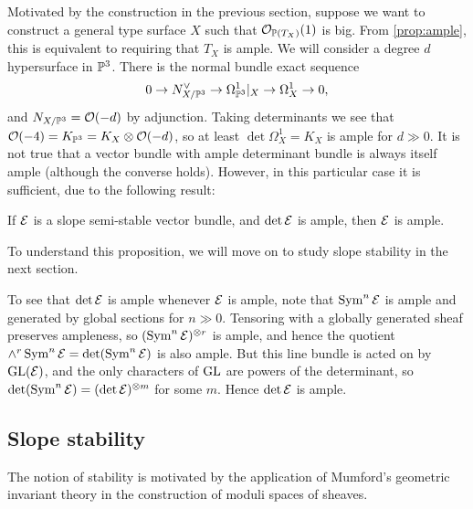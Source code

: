 Motivated by the construction in the previous section, suppose we want to
construct a general type surface $X$ such that $\O_{\P(T_X)}(1)$ is big. From
\cref{prop:ample}, this is equivalent to requiring that $T_X$ is ample. We will
consider a degree $d$ hypersurface in $\P^3$. There is the normal bundle exact
sequence
\begin{equation*}
    0 \to N_{X/\P^3}^\vee \to \Omega^1_{\P^3}|_X \to \Omega^1_X \to 0,
\end{equation*}
and $N_{X/\P^3}=\O(-d)$ by adjunction. Taking determinants we see that
$\O(-4)=K_{\P^3}=K_X\otimes\O(-d)$, so at least $\det\Omega^1_X=K_X$ is ample
for $d\gg0$. It is not true that a vector bundle with ample determinant bundle
is always itself ample (although the converse holds). However, in this
particular case it is sufficient, due to the following result:


\begin{proposition}\label{prop:stable ample}
    If $\calE$ is a slope semi-stable vector bundle, and $\det\calE$ is ample,
    then $\calE$ is ample.
\end{proposition}

To understand this proposition, we will move on to study slope stability in the
next section.

\begin{remark}
    To see that $\det\calE$ is ample whenever $\calE$ is ample, note that
    $\Sym^n\calE$ is ample and generated by global sections for $n\gg0$.
    Tensoring with a globally generated sheaf preserves ampleness, so
    $(\Sym^n\calE)^{\otimes r}$ is ample, and hence the quotient
    $\wedge^r\Sym^n\calE=\det(\Sym^n\calE)$ is also ample. But this line bundle
    is acted on by $\GL(\calE)$, and the only characters of $\GL$ are powers of
    the determinant, so $\det(\Sym^n\calE)=(\det\calE)^{\otimes m}$ for some
    $m$. Hence $\det\calE$ is ample.
\end{remark}

\subsection{Slope stability}

The notion of stability is motivated by the application of Mumford's geometric
invariant theory in the construction of moduli spaces of sheaves.

